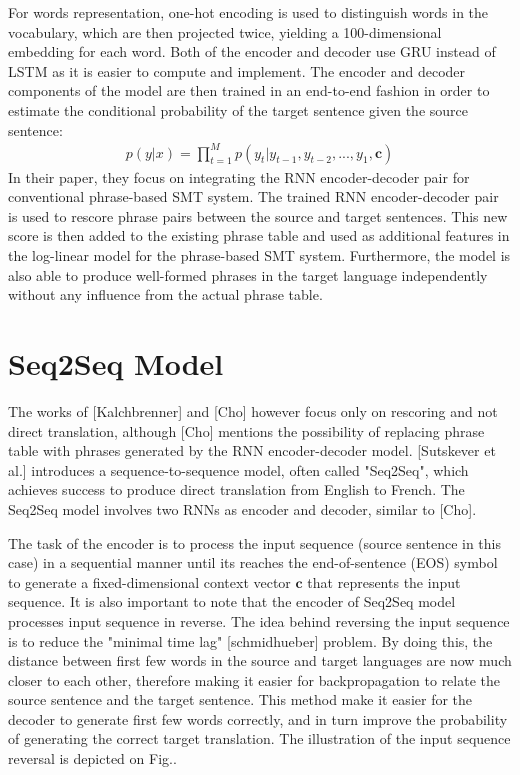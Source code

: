 \documentclass[12pt]{extarticle}
\begin{document}
For words representation, one-hot encoding is used to distinguish words in the vocabulary, which are then projected twice, yielding a 100-dimensional embedding for each word.
Both of the encoder and decoder use GRU instead of LSTM as it is easier to compute and implement. The encoder and decoder components of the model are then trained in an end-to-end fashion in order to estimate the conditional probability of the target sentence given the source sentence: 
\begin{align}
p(y|x) = \prod_{t=1}^{M} p(y_{t} | y_{t-1}, y_{t-2},...,y_{1}, \textbf{c}) \label{eq:19}
\end{align}
In their paper, they focus on integrating the RNN encoder-decoder pair for conventional phrase-based SMT system. The trained RNN encoder-decoder pair is used to rescore phrase pairs between the source and target sentences. This new score is then added to the existing phrase table and used as additional features in the log-linear model for the phrase-based SMT system. Furthermore, the model is also able to produce well-formed phrases in the target language independently without any influence from the actual phrase table.


\section*{Seq2Seq Model}
The works of [Kalchbrenner] and [Cho] however focus only on rescoring and not direct translation, although [Cho] mentions the possibility of replacing phrase table with phrases generated by the RNN encoder-decoder model. [Sutskever et al.] introduces a sequence-to-sequence model, often called "Seq2Seq", which achieves success to produce direct translation from English to French. The Seq2Seq model involves two RNNs as encoder and decoder, similar to [Cho].


The task of the encoder is to process the input sequence (source sentence in this case) in a sequential manner until its reaches the end-of-sentence (EOS) symbol to generate a fixed-dimensional context vector $\textbf{c}$ that represents the input sequence. It is also important to note that the encoder of Seq2Seq model processes input sequence in reverse. The idea behind reversing the input sequence is to reduce the "minimal time lag" [schmidhueber] problem. By doing this, the distance between first few words in the source and target languages are now much closer to each other, therefore making it easier for backpropagation to relate the source sentence and the target sentence. This method make it easier for the decoder to generate first few words correctly, and in turn improve the probability of generating the correct target translation. The illustration of the input sequence reversal is depicted on Fig..%
\end{document}
